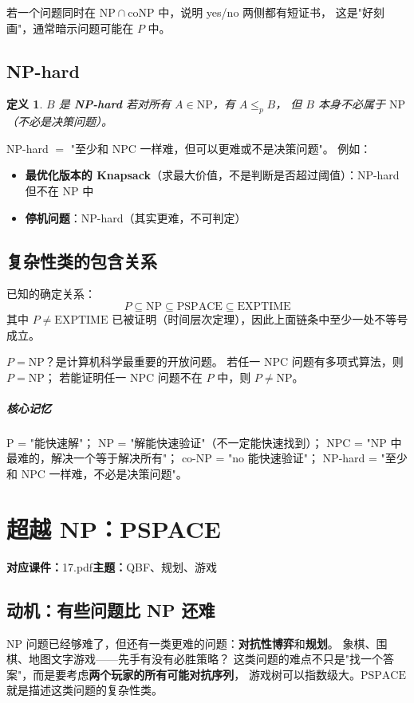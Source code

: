 \documentclass[UTF8,openany,12pt]{ctexbook}
\newtheorem{definition}{定义}[chapter]
\theoremstyle{remark}
\newcommand{\lecture}[3]{
  \chapter{#2}
  \noindent\textbf{对应课件：}#1\hfill\textbf{主题：}#3
  \vspace{0.6em}
}
\newcommand{\keypoint}[1]{\paragraph{核心记忆}#1}
\newcommand{\NP}{\mathrm{NP}}
\newcommand{\coNP}{\mathrm{coNP}}
\newcommand{\PSPACE}{\mathrm{PSPACE}}
\newcommand{\EXPTIME}{\mathrm{EXPTIME}}
\begin{document}
若一个问题同时在 $\NP \cap \coNP$ 中，说明 yes/no 两侧都有短证书，
这是"好刻画"，通常暗示问题可能在 $P$ 中。

\section{NP-hard}

\begin{definition}
$B$ 是 \textbf{NP-hard} 若对所有 $A \in \NP$，有 $A \le_p B$，
但 $B$ 本身不必属于 $\NP$（不必是决策问题）。
\end{definition}

NP-hard $=$ "至少和 NPC 一样难，但可以更难或不是决策问题"。
例如：
\begin{itemize}
  \item \textbf{最优化版本的 Knapsack}（求最大价值，不是判断是否超过阈值）：NP-hard 但不在 NP 中
  \item \textbf{停机问题}：NP-hard（其实更难，不可判定）
\end{itemize}

\section{复杂性类的包含关系}

已知的确定关系：
\[
  P \subseteq \NP \subseteq \PSPACE \subseteq \EXPTIME
\]
其中 $P \ne \EXPTIME$ 已被证明（时间层次定理），因此上面链条中至少一处不等号成立。

$P = \NP$？是计算机科学最重要的开放问题。
若任一 NPC 问题有多项式算法，则 $P = \NP$；
若能证明任一 NPC 问题不在 $P$ 中，则 $P \ne \NP$。

\keypoint{
  P = "能快速解"；
  NP = "解能快速验证"（不一定能快速找到）；
  NPC = "NP 中最难的，解决一个等于解决所有"；
  co-NP = "no 能快速验证"；
  NP-hard = "至少和 NPC 一样难，不必是决策问题"。
}

\lecture{17.pdf}{超越 NP：PSPACE}{QBF、规划、游戏}

\section*{动机：有些问题比 NP 还难}

$\NP$ 问题已经够难了，但还有一类更难的问题：\textbf{对抗性博弈}和\textbf{规划}。
象棋、围棋、地图文字游戏——先手有没有必胜策略？
这类问题的难点不只是"找一个答案"，而是要考虑\textbf{两个玩家的所有可能对抗序列}，
游戏树可以指数级大。$\PSPACE$ 就是描述这类问题的复杂性类。
\end{document}
